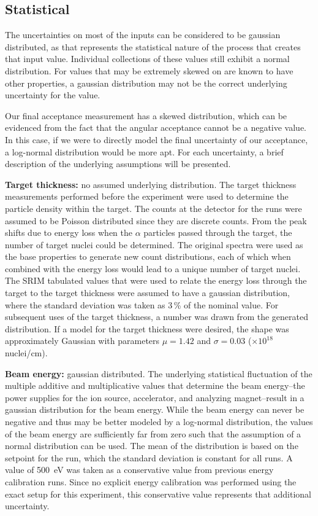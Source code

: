 \subsection{Statistical}

The uncertainties on most of the inputs can be considered to be gaussian
distributed, as that represents the statistical nature of the process
that creates that input value. Individual collections of these values
still exhibit a normal distribution. For values that may be extremely
skewed on are known to have other properties, a gaussian distribution
may not be the correct underlying uncertainty for the value.

Our final acceptance measurement has a skewed distribution, which can be
evidenced from the fact that the angular acceptance cannot be a negative
value. In this case, if we were to directly model the final uncertainty
of our acceptance, a log-normal distribution would be more apt. For each
uncertainty, a brief description of the underlying assumptions will be
presented.

\textbf{Target thickness:} no assumed underlying distribution. The
target thickness measurements performed before the experiment were used
to determine the particle density within the target. The counts at the
detector for the runs were assumed to be Poisson distributed since they
are discrete counts. From the peak shifts due to energy loss when the
$\alpha$ particles passed through the target, the number of target
nuclei could be determined. The original spectra were used as the base
properties to generate new count distributions, each of which when
combined with the energy loss would lead to a unique number of target
nuclei. The SRIM tabulated values that were used to relate the energy
loss through the target to the target thickness were assumed to have a
gaussian distribution, where the standard deviation was taken as 3\,\%
of the nominal value. For subsequent uses of the target thickness, a
number was drawn from the generated distribution. If a model for the
target thickness were desired, the shape was approximately Gaussian with
parameters $\mu = 1.42$ and $\sigma = 0.03$ ($\times 10^{18}$
nuclei/cm\squared{}).

\textbf{Beam energy:} gaussian distributed. The underlying statistical
fluctuation of the multiple additive and multiplicative values that
determine the beam energy\---{}the power supplies for the ion source,
accelerator, and analyzing magnet\---{}result in a gaussian distribution
for the beam energy. While the beam energy can never be negative and
thus may be better modeled by a log-normal distribution, the values of
the beam energy are sufficiently far from zero such that the assumption
of a normal distribution can be used. The mean of the distribution is
based on the setpoint for the run, which the standard deviation is
constant for all runs. A value of 500~eV was taken as a conservative
value from previous energy calibration runs. Since no explicit energy
calibration was performed using the exact setup for this experiment,
this conservative value represents that additional uncertainty.

